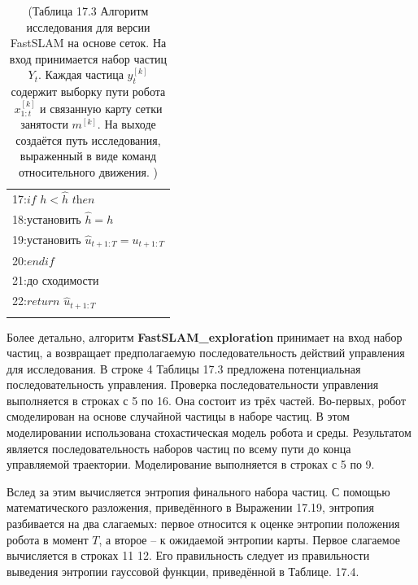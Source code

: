 \documentclass[10pt,a4paper]{article}
\begin{document}
\begin{table}[H]
\begin{center}
\begin{tabular}{|l|}
17:\hspace{9mm}$\textit{if}\,\,h<\hat{h}\,\,\textit{then}$\\
18:\hspace{14mm}$\textit{установить}\,\,\hat{h}=h$\\
19:\hspace{14mm}$\textit{установить}\,\,\hat{u}_{t+1:T}=u_{t+1:T}$\\
20:\hspace{9mm}$\textit{endif}$\\
21:\hspace{4mm}$\textit{до сходимости}$\\
22:\hspace{4mm}$\textit{return}\,\,\hat{u}_{t+1:T}$\\
{}\\
\hline
\end{tabular}
\caption{(Таблица 17.3 Алгоритм исследования для версии FastSLAM на основе сеток. На вход принимается набор частиц $Y_t$. Каждая частица $y_t^{[k]}$  содержит выборку пути робота $x_{1:t}^{[k]}$  и связанную карту сетки занятости $m^{[k]}$. На выходе создаётся путь исследования, выраженный в виде команд относительного движения. )}
\end{center}
\end{table}

Более детально, алгоритм \textbf{FastSLAM\_exploration} принимает на вход набор частиц, а возвращает предполагаемую последовательность действий управления для исследования. В строке 4 Таблицы 17.3 предложена потенциальная последовательность управления. Проверка последовательности управления выполняется в строках с 5 по 16. Она состоит из трёх частей. Во-первых, робот смоделирован на основе случайной частицы в наборе частиц. В этом моделировании использована стохастическая модель робота и среды. Результатом является последовательность наборов частиц по всему пути до конца управляемой траектории. Моделирование выполняется в строках с 5 по 9.

Вслед за этим вычисляется энтропия финального набора частиц. С помощью математического разложения, приведённого в Выражении 17.19, энтропия разбивается на два слагаемых: первое относится к оценке энтропии положения робота в момент $T$, а второе – к ожидаемой энтропии карты. Первое слагаемое вычисляется в строках 11 12. Его правильность следует из правильности выведения энтропии гауссовой функции, приведённой в Таблице. 17.4.
\end{document}

